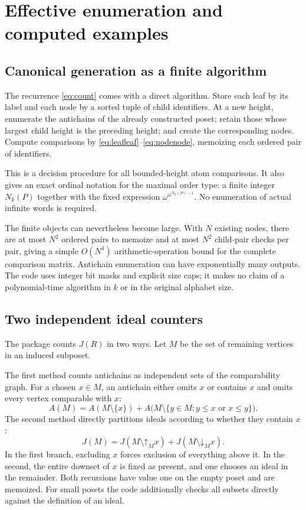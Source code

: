 \documentclass[11pt,letterpaper]{article}
\theoremstyle{definition}
\theoremstyle{remark}
\newcommand{\down}{\mathord{\downarrow}}
\newcommand{\up}{\mathord{\uparrow}}
\begin{document}
\section{Effective enumeration and computed examples}\label{sec:computations}

\subsection{Canonical generation as a finite algorithm}

The recurrence \eqref{eq:count} comes with a direct algorithm. Store each
leaf by its label and each node by a sorted tuple of child identifiers.
At a new height, enumerate the antichains of the already constructed
poset; retain those whose largest child height is the preceding height;
and create the corresponding nodes. Compute comparisons by
\eqref{eq:leafleaf}--\eqref{eq:nodenode}, memoizing each ordered pair of
identifiers.

This is a decision procedure for all bounded-height atom comparisons.
It also gives an exact ordinal notation for the maximal order type:
a finite integer $N_k(P)$ together with the fixed expression
$\omega^{\omega^{N_k(P)-1}}$. No enumeration of actual infinite words is
required.

The finite objects can nevertheless become large. With $N$ existing
nodes, there are at most $N^2$ ordered pairs to memoize and at most $N^2$
child-pair checks per pair, giving a simple $O(N^4)$ arithmetic-operation
bound for the complete comparison matrix. Antichain enumeration can have
exponentially many outputs. The code uses integer bit masks and explicit
size caps; it makes no claim of a polynomial-time algorithm in $k$ or
in the original alphabet size.

\subsection{Two independent ideal counters}

The package counts $J(R)$ in two ways. Let $M$ be the set of remaining
vertices in an induced subposet.

The first method counts antichains as independent sets of the
comparability graph. For a chosen $x\in M$, an antichain either omits
$x$ or contains $x$ and omits every vertex comparable with $x$:
\begin{equation}\label{eq:antichaincount}
 A(M)=A(M\setminus\{x\})+
 A\bigl(M\setminus\{y\in M:y\le x\text{ or }x\le y\}\bigr).
\end{equation}
The second method directly partitions ideals according to whether they
contain $x$:
\begin{equation}\label{eq:idealcount}
 J(M)=J(M\setminus\up_M x)+J(M\setminus\down_M x).
\end{equation}
In the first branch, excluding $x$ forces exclusion of everything above
it. In the second, the entire downset of $x$ is fixed as present, and
one chooses an ideal in the remainder. Both recursions have value one
on the empty poset and are memoized. For small posets the code additionally
checks all subsets directly against the definition of an ideal.
\end{document}
